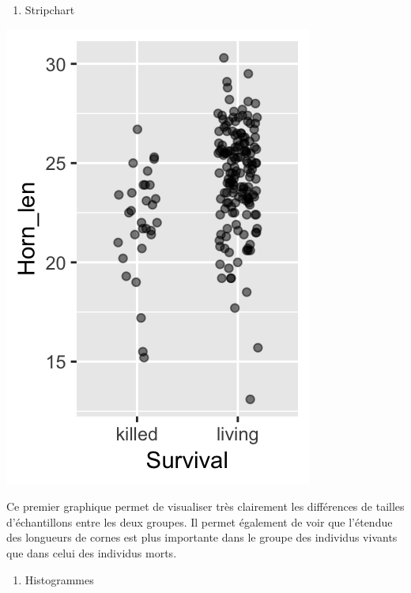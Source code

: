 \documentclass[a4paperpaper,]{article}
\newenvironment{Shaded}{\begin{snugshade}}{\end{snugshade}}
\newcommand{\DataTypeTok}[1]{\textcolor[rgb]{0.00,0.34,0.68}{#1}}
\newcommand{\DecValTok}[1]{\textcolor[rgb]{0.69,0.50,0.00}{#1}}
\newcommand{\FloatTok}[1]{\textcolor[rgb]{0.69,0.50,0.00}{#1}}
\newcommand{\KeywordTok}[1]{\textcolor[rgb]{0.12,0.11,0.11}{\textbf{#1}}}
\newcommand{\NormalTok}[1]{\textcolor[rgb]{0.12,0.11,0.11}{#1}}
\newcommand{\OperatorTok}[1]{\textcolor[rgb]{0.12,0.11,0.11}{#1}}
\newcommand{\StringTok}[1]{\textcolor[rgb]{0.75,0.01,0.01}{#1}}
\providecommand{\tightlist}{%
  \setlength{\itemsep}{0pt}\setlength{\parskip}{0pt}}
\begin{document}
\begin{enumerate}
\def\labelenumi{\arabic{enumi}.}
\tightlist
\item
  Stripchart
\end{enumerate}

\begin{Shaded}
\end{Shaded}

\begin{center}\includegraphics[width=0.25\linewidth]{figure/unnamed-chunk-50-1} \end{center}

Ce premier graphique permet de visualiser très clairement les différences de tailles d'échantillons entre les deux groupes. Il permet également de voir que l'étendue des longueurs de cornes est plus importante dans le groupe des individus vivants que dans celui des individus morts.

\begin{enumerate}
\def\labelenumi{\arabic{enumi}.}
\setcounter{enumi}{1}
\tightlist
\item
  Histogrammes
\end{enumerate}

\begin{Shaded}
\end{Shaded}
\end{document}
